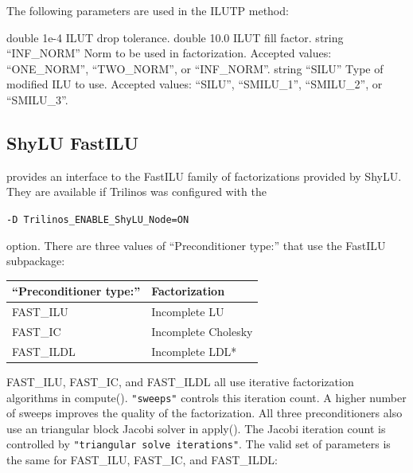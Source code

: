 The following parameters are used in the ILUTP method:

    {double}
    {1e-4}
    {ILUT drop tolerance.}
    {double}
    {10.0}
    {ILUT fill factor.}
    {string}
    {``INF\_NORM''}
    {Norm to be used in factorization. Accepted values: ``ONE\_NORM'', ``TWO\_NORM'', or ``INF\_NORM''.}
    {string}
    {``SILU''}
    {Type of modified ILU to use. Accepted values: ``SILU'', ``SMILU\_1'', ``SMILU\_2'', or ``SMILU\_3''.}

\subsection{ShyLU FastILU}\label{s:FastILU}
\ifpacktwo{} provides an interface to the FastILU family of factorizations provided by ShyLU.
They are available if Trilinos was configured with the

\texttt{-D Trilinos\_ENABLE\_ShyLU\_Node=ON}

option. There are three values of ``Preconditioner type:'' that use the FastILU subpackage:

\begin{table}[h!]
\centering
\begin{tabular}{|l|l|}
\hline
``Preconditioner type:'' & Factorization   \\ \hline \hline
FAST\_ILU                & Incomplete LU       \\ \hline
FAST\_IC                 & Incomplete Cholesky \\ \hline
FAST\_ILDL               & Incomplete LDL*     \\ \hline
\end{tabular}
\end{table}

FAST\_ILU, FAST\_IC, and FAST\_ILDL all use iterative factorization algorithms in compute(). \texttt{"sweeps"} controls
this iteration count. A higher number of sweeps improves the quality of the factorization. All three
preconditioners also use an triangular block Jacobi solver in apply().
The Jacobi iteration count is controlled by \texttt{"triangular solve iterations"}.
The valid set of parameters is the same for FAST\_ILU, FAST\_IC, and FAST\_ILDL:

